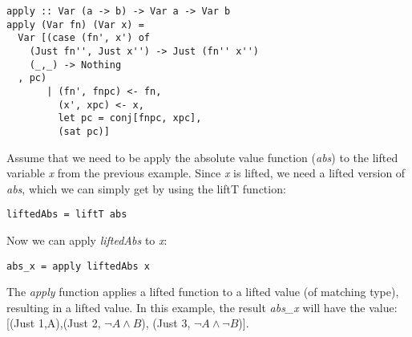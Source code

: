 \documentclass[10pt,conference]{llncs}
\begin{document}
\begin{verbatim}
apply :: Var (a -> b) -> Var a -> Var b
apply (Var fn) (Var x) =
  Var [(case (fn', x') of
    (Just fn'', Just x'') -> Just (fn'' x'')
    (_,_) -> Nothing
  , pc) 
       | (fn', fnpc) <- fn,
         (x', xpc) <- x,
         let pc = conj[fnpc, xpc],
         (sat pc)]
\end{verbatim}

\begin{exmp}

Assume that we need to be apply the absolute value function (\emph{abs}) to the lifted variable \emph{x} from the previous example. Since \emph{x} is lifted, we need a lifted version of \emph{abs}, which we can simply get by using the liftT function:

\begin{verbatim}
liftedAbs = liftT abs
\end{verbatim}

Now we can apply \emph{liftedAbs} to \emph{x}:

\begin{verbatim}
abs_x = apply liftedAbs x
\end{verbatim}

The \emph{apply} function applies a lifted function to a lifted value (of matching type), resulting in a lifted value. In this example, the result \emph{abs\_x} will have the value: \\

[(Just 1,A),(Just 2, $\neg A \wedge B$), (Just 3, $\neg A\wedge \neg B$)].

\end{exmp}
\end{document}
